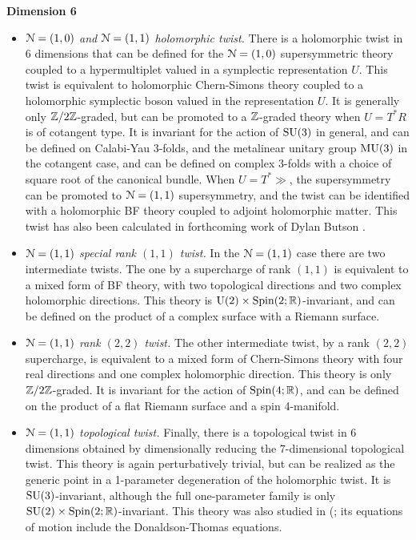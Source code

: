 \documentclass[10pt, oneside]{article}
\begin{document}
\textbf{Dimension 6}
\begin{itemize}
 \item \emph{$\mathcal{N}=(1,0)$ and $\mathcal{N}=(1,1)$ holomorphic twist.} There is a holomorphic twist in 6 dimensions that can be defined for the $\mathcal{N}=(1,0)$ supersymmetric theory coupled to a hypermultiplet valued in a symplectic representation $U$.  This twist is equivalent to holomorphic Chern-Simons theory coupled to a holomorphic symplectic boson valued in the representation $U$.  It is generally only $\mathbb Z/2\mathbb Z$-graded, but can be promoted to a $\mathbb Z$-graded theory when $U = T^*R$ is of cotangent type.  It is invariant for the action of $\mathrm{SU}(3)$ in general, and can be defined on Calabi-Yau 3-folds, and the metalinear unitary group $\mathrm{MU}(3)$ in the cotangent case, and can be defined on complex 3-folds with a choice of square root of the canonical bundle.  When $U = T^*\gg$, the supersymmetry can be promoted to $\mathcal{N}=(1,1)$ supersymmetry, and the twist can be identified with a holomorphic BF theory coupled to adjoint holomorphic matter.  This twist has also been calculated in forthcoming work of Dylan Butson \cite{Butson}. 
 \item \emph{$\mathcal{N}=(1,1)$ special rank $(1,1)$ twist.} In the $\mathcal{N}=(1,1)$ case there are two intermediate twists.  The one by a supercharge of rank $(1,1)$ is equivalent to a mixed form of BF theory, with two topological directions and two complex holomorphic directions.  This theory is $\mathrm{U}(2) \times \mathrm{Spin}(2;\mathbb R)$-invariant, and can be defined on the product of a complex surface with a Riemann surface.
 \item \emph{$\mathcal{N}=(1,1)$ rank $(2,2)$ twist.} The other intermediate twist, by a rank $(2,2)$ supercharge, is equivalent to a mixed form of Chern-Simons theory with four real directions and one complex holomorphic direction.  This theory is only $\mathbb Z/2\mathbb Z$-graded.  It is invariant for the action of $\mathrm{Spin}(4;\mathbb R)$, and can be defined on the product of a flat Riemann surface and a spin 4-manifold.
 \item \emph{$\mathcal{N}=(1,1)$ topological twist.} Finally, there is a topological twist in 6 dimensions obtained by dimensionally reducing the 7-dimensional topological twist.  This theory is again perturbatively trivial, but can be realized as the generic point in a 1-parameter degeneration of the holomorphic twist.  It is $\mathrm{SU}(3)$-invariant, although the full one-parameter family is only $\mathrm{SU}(2) \times \mathrm{Spin}(2;\mathbb R)$-invariant.  This theory was also studied in \cite{AcharyaOLoughlinSpence} (; its equations of motion include the Donaldson-Thomas equations.
\end{itemize}
\end{document}
